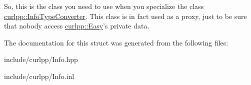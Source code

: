 So, this is the class you need to use when you specialize the class \hyperlink{structcurlpp_1_1InfoTypeConverter}{curlpp\-::\-Info\-Type\-Converter}. This class is in fact used as a proxy, just to be sure that nobody access \hyperlink{classcurlpp_1_1Easy}{curlpp\-::\-Easy}'s private data. 

The documentation for this struct was generated from the following files\-:\begin{DoxyCompactItemize}
\item 
include/curlpp/Info.\-hpp\item 
include/curlpp/Info.\-inl\end{DoxyCompactItemize}
